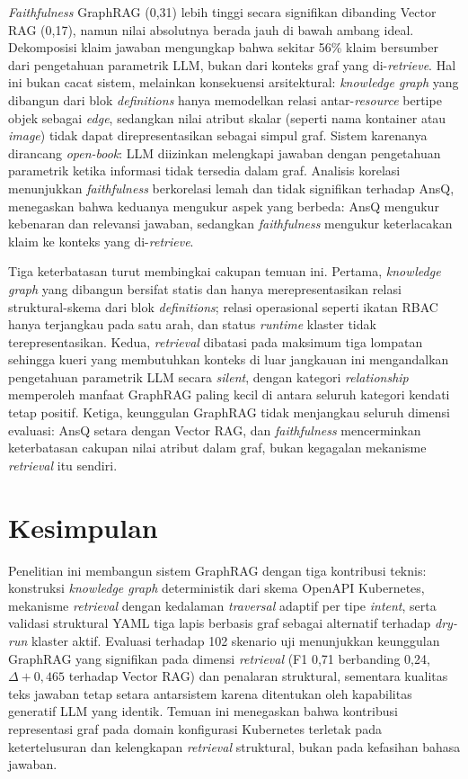 \documentclass{ieeeaccess}
\begin{document}
\textit{Faithfulness} GraphRAG (0,31) lebih tinggi secara signifikan dibanding Vector RAG (0,17), namun nilai absolutnya berada jauh di bawah ambang ideal. Dekomposisi klaim jawaban mengungkap bahwa sekitar 56\% klaim bersumber dari pengetahuan parametrik LLM, bukan dari konteks graf yang di-\textit{retrieve}. Hal ini bukan cacat sistem, melainkan konsekuensi arsitektural: \textit{knowledge graph} yang dibangun dari blok \textit{definitions} hanya memodelkan relasi antar-\textit{resource} bertipe objek sebagai \textit{edge}, sedangkan nilai atribut skalar (seperti nama kontainer atau \textit{image}) tidak dapat direpresentasikan sebagai simpul graf. Sistem karenanya dirancang \textit{open-book}: LLM diizinkan melengkapi jawaban dengan pengetahuan parametrik ketika informasi tidak tersedia dalam graf. Analisis korelasi menunjukkan \textit{faithfulness} berkorelasi lemah dan tidak signifikan terhadap AnsQ, menegaskan bahwa keduanya mengukur aspek yang berbeda: AnsQ mengukur kebenaran dan relevansi jawaban, sedangkan \textit{faithfulness} mengukur keterlacakan klaim ke konteks yang di-\textit{retrieve}.

Tiga keterbatasan turut membingkai cakupan temuan ini. Pertama, \textit{knowledge graph} yang dibangun bersifat statis dan hanya merepresentasikan relasi struktural-skema dari blok \textit{definitions}; relasi operasional seperti ikatan RBAC hanya terjangkau pada satu arah, dan status \textit{runtime} klaster tidak terepresentasikan. Kedua, \textit{retrieval} dibatasi pada maksimum tiga lompatan sehingga kueri yang membutuhkan konteks di luar jangkauan ini mengandalkan pengetahuan parametrik LLM secara \textit{silent}, dengan kategori \textit{relationship} memperoleh manfaat GraphRAG paling kecil di antara seluruh kategori kendati tetap positif. Ketiga, keunggulan GraphRAG tidak menjangkau seluruh dimensi evaluasi: AnsQ setara dengan Vector RAG, dan \textit{faithfulness} mencerminkan keterbatasan cakupan nilai atribut dalam graf, bukan kegagalan mekanisme \textit{retrieval} itu sendiri.

\section{Kesimpulan}
\label{sec:kesimpulan}

Penelitian ini membangun sistem GraphRAG dengan tiga kontribusi teknis: konstruksi \textit{knowledge graph} deterministik dari skema OpenAPI Kubernetes, mekanisme \textit{retrieval} dengan kedalaman \textit{traversal} adaptif per tipe \textit{intent}, serta validasi struktural YAML tiga lapis berbasis graf sebagai alternatif terhadap \textit{dry-run} klaster aktif. Evaluasi terhadap 102 skenario uji menunjukkan keunggulan GraphRAG yang signifikan pada dimensi \textit{retrieval} (F1 0,71 berbanding 0,24, $\Delta{+}0{,}465$ terhadap Vector RAG) dan penalaran struktural, sementara kualitas teks jawaban tetap setara antarsistem karena ditentukan oleh kapabilitas generatif LLM yang identik. Temuan ini menegaskan bahwa kontribusi representasi graf pada domain konfigurasi Kubernetes terletak pada ketertelusuran dan kelengkapan \textit{retrieval} struktural, bukan pada kefasihan bahasa jawaban.
\end{document}
